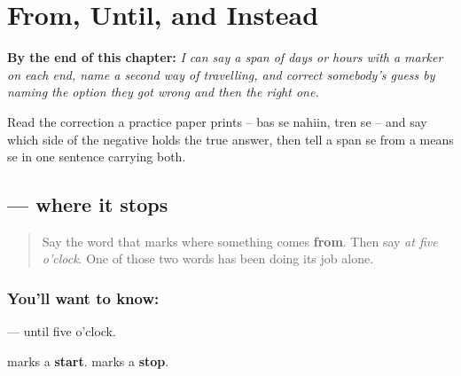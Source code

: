 
\chapter{From, Until, and Instead}
\label{ch:hi-safar}

\begin{chapteropening}
\textbf{By the end of this chapter:} \emph{I can say a span of days or hours with a marker on each end, name a second way of travelling, and correct somebody's guess by naming the option they got wrong and then the right one.}

Read the correction a practice paper prints -- bas se nahiin, tren se -- and say which side of the negative holds the true answer, then tell a span se from a means se in one sentence carrying both.
\end{chapteropening}

\section[\texorpdfstring{\hi{तक} (tak)}{तक (tak)}]{ — where it stops}

\label{lesson:HI-C94-tak}



\begin{quote}
Say the word that marks where something comes \textbf{from}. Then say \emph{at five o'clock}. One of those two words has been doing its job alone.
\end{quote}

\subsection*{You'll want to know: }
\textbf{  } — until five o'clock.

\textbf{} marks a \textbf{start}. \textbf{} marks a \textbf{stop}.

